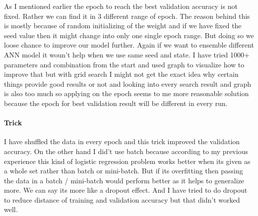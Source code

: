 \documentclass[11pt, a4paper , landscape]{article}
\begin{document}
As I mentioned earlier the epoch to reach the best validation accuracy
is not fixed. Rather we can find it in 3 different range of epoch. The
reason behind this is mostly because of random initializing of the
weight and if we have fixed the seed value then it might change into
only one single epoch range. But doing so we loose chance to improve our
model further. Again if we want to ensemble different ANN model it
woun't help when we use same seed and state. I have tried 1000+
parameters and combination from the start and used graph to visualize
how to improve that but with grid search I might not get the exact idea
why certain things provide good results or not and looking into every
search result and graph is also too much so applying on the epoch seems
to me more reasonable solution because the epoch for best validation
result will be different in every run.

    \paragraph{Trick}\label{trick}

I have shuffled the data in every epoch and this trick improved the
validation accuracy. On the other hand I did't use batch because
according to my previous experience this kind of logistic regression
problem works better when its given as a whole set rather than batch or
mini-batch. But if its overfitting then passing the data in a batch /
mini-batch would perform better as it helps to generalize more. We can
say its more like a dropout effect. And I have tried to do dropout to
reduce distance of training and validation accuracy but that didn't
worked well.
\end{document}
